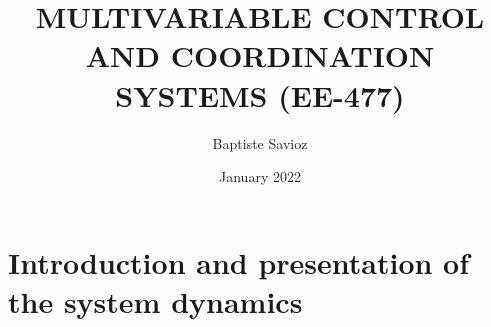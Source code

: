 \documentclass{article}
\title{MULTIVARIABLE CONTROL AND
COORDINATION SYSTEMS
(EE-477)
}
\author{Baptiste Savioz }
\date{January 2022}
\begin{document}
\label{page:titre}


\newpage
\tableofcontents
\newpage


\section{Introduction and presentation of the system dynamics}
\label{sec:dynamics}




\newpage
\printbibliography 
\end{document}
